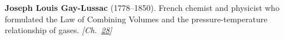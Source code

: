 \textbf{Joseph Louis Gay-Lussac} (1778–1850). French chemist and physicist who formulated the Law of Combining Volumes and the pressure-temperature relationship of gases. \emph{[Ch.~\hyperref[ch:negativetemperature]{28}]}

